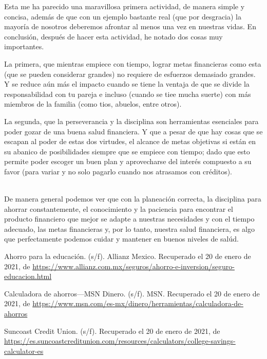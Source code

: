 \documentclass[11pt]{article}
\begin{document}
	\par Esta me ha parecido una maravillosa primera actividad, de manera simple y concisa, además de que con un ejemplo bastante real (que por desgracia) la mayoría de nosotros deberemos afrontar al menos una vez en nuestras vidas. En conclusión, después de hacer esta actividad, he notado dos cosas muy importantes. 
	\par La primera, que mientras empiece con tiempo, lograr metas financieras como esta (que se pueden considerar grandes) no requiere de esfuerzos demasiado grandes. Y se reduce aún más el impacto cuando se tiene la ventaja de que se divide la responsabilidad con tu pareja e incluso (cuando se tiee mucha suerte) con más miembros de la familia (como tios, abuelos, entre otros).
	\par La segunda, que la perseverancia y la disciplina son herramientas esenciales para poder gozar de una buena salud financiera. Y que a pesar de que hay cosas que se escapan al poder de estas dos virtudes, el alcance de metas objetivas si están en su abanico de posibilidades siempre que se empiece con tiempo; dado que esto permite poder escoger un buen plan y aprovecharse del interés compuesto a su favor (para variar y no solo pagarlo cuando nos atrasamos con créditos).
	\\\
	\par De manera general podemos ver que con la planeación correcta, la disciplina para ahorrar constantemente, el conocimiento y la paciencia para encontrar el producto financiero que mejor se adapte a nuestras necesidades y con el tiempo adecuado, las metas financieras y, por lo tanto, nuestra salud financiera, es algo que perfectamente podemos cuidar y mantener en buenos niveles de salúd.




	\begin{thebibliography}{X}
	
		 Ahorro para la educación. (s/f). Allianz Mexico. Recuperado el 20 de enero de 2021, de \url{https://www.allianz.com.mx/seguros/ahorro-e-inversion/seguro-educacion.html}

		 Calculadora de ahorros—MSN Dinero. (s/f). MSN. Recuperado el 20 de enero de 2021, de \url{https://www.msn.com/es-mx/dinero/herramientas/calculadora-de-ahorros}

		 Suncoast Credit Union. (s/f). Recuperado el 20 de enero de 2021, de \url{https://es.suncoastcreditunion.com/resources/calculators/college-savings-calculator-es}

	
	\end{thebibliography}
\end{document}
